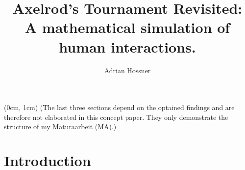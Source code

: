 \documentclass{article}
\title{
	Axelrod's Tournament Revisited: \\
	\large A mathematical simulation of human interactions.
}
\author{Adrian Hossner}
\begin{document}
\maketitle
\tableofcontents

\begin{textblock*}{100mm}(0cm, 1cm)
	(The last three sections depend on the optained findings and are therefore not elaborated in this concept paper. They only demonstrate the structure of my Maturaarbeit (MA).)
\end{textblock*}
\newpage

\section{Introduction}
\end{document}

